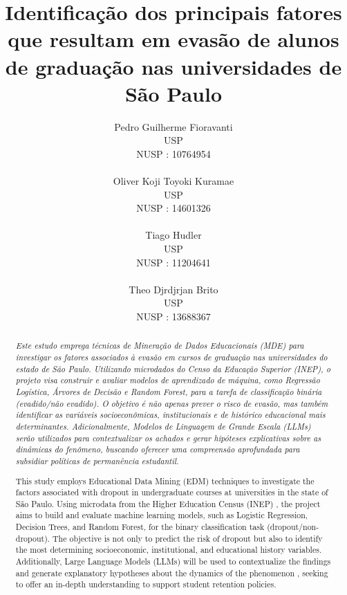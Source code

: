\documentclass[brazilian, english, spanish]{RBIEarticle}
\title{Identificação dos principais fatores que resultam em evasão de alunos de graduação nas universidades de São Paulo}
\author{%
	\parbox{4cm}{%
		Pedro Guilherme Fioravanti \\
		USP\\
		NUSP : 10764954\\
	}
	\parbox{4cm}{%
		Oliver Koji Toyoki Kuramae\\
		USP\\
		NUSP : 14601326\\
	}
    \parbox{4cm}{%
		Tiago Hudler \\
		USP\\
		NUSP : 11204641\\
	}
	\parbox{4cm}{%
		Theo Djrdjrjan Brito\\
		USP\\
		NUSP : 13688367\\
	}
}
\begin{document}
\maketitle
\begin{otherlanguage}{brazilian}
\begin{abstract}
\textit{Este estudo emprega técnicas de Mineração de Dados Educacionais (MDE) para investigar os fatores associados à evasão em cursos de graduação nas universidades do estado de São Paulo. Utilizando microdados do Censo da Educação Superior (INEP), o projeto visa construir e avaliar modelos de aprendizado de máquina, como Regressão Logística, Árvores de Decisão e Random Forest, para a tarefa de classificação binária (evadido/não evadido). O objetivo é não apenas prever o risco de evasão, mas também identificar as variáveis socioeconômicas, institucionais e de histórico educacional mais determinantes. Adicionalmente, Modelos de Linguagem de Grande Escala (LLMs) serão utilizados para contextualizar os achados e gerar hipóteses explicativas sobre as dinâmicas do fenômeno, buscando oferecer uma compreensão aprofundada para subsidiar políticas de permanência estudantil.}
\end{abstract}
\end{otherlanguage}
\begin{otherlanguage}{english}
\begin{abstract}
This study employs Educational Data Mining (EDM) techniques to investigate the factors associated with dropout in undergraduate courses at universities in the state of São Paulo. Using microdata from the Higher Education Census (INEP) , the project aims to build and evaluate machine learning models, such as Logistic Regression, Decision Trees, and Random Forest, for the binary classification task (dropout/non-dropout). The objective is not only to predict the risk of dropout but also to identify the most determining socioeconomic, institutional, and educational history variables. Additionally, Large Language Models (LLMs) will be used to contextualize the findings and generate explanatory hypotheses about the dynamics of the phenomenon , seeking to offer an in-depth understanding to support student retention policies.
\end{abstract}
\end{otherlanguage}
\end{document}
